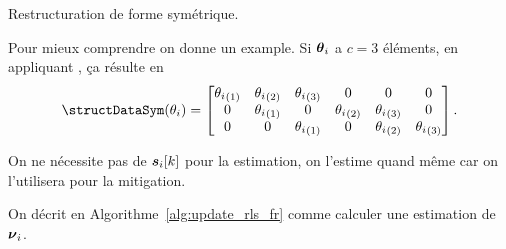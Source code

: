 \documentclass[../main.tex]{subfiles}
\begin{document}
\begin{algorithm2e}[h]
  \DontPrintSemicolon%
          \caption{Restructuration de forme symétrique.}\label{alg:struct_symmetric_fr}
        \end{algorithm2e}
Pour mieux comprendre on donne un example.
Si $\boldsymbol{\theta}_{i}$ a ${c=3}$ éléments, en appliquant \structDataSym, ça résulte en
\begin{equation}
  \text{\structDataSym}(\theta_i)=
  \left[
  \begin{matrix}
     \elem[1]{\theta_{i}}  &   \elem[2]{\theta_{i}}   &  \elem[3]{\theta_{i}} &    0  &   0  &   0 \\
     0  &   \elem[1]{\theta_{i}}   &  0 &    \elem[2]{\theta_{i}}  &   \elem[3]{\theta_{i}}  &   0 \\
     0  &   0   &  \elem[1]{\theta_{i}} &    0  &   \elem[2]{\theta_{i}}  &   \elem[3]{\theta_{i}}
  \end{matrix}
  \right].
\end{equation}

\begin{remark}
  On ne nécessite pas de $\boldsymbol{s}_{i}[k]$ pour la estimation, on l'estime quand même car on l'utilisera pour la mitigation.
\end{remark}

On décrit en Algorithme~\ref{alg:update_rls_fr} comme calculer une estimation de ${\boldsymbol{\nu}_{i}}$.
\end{document}
